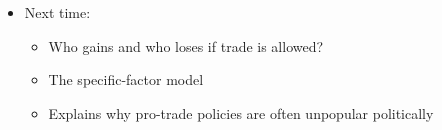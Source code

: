 \documentclass[ignorenonframetext,]{beamer}
\begin{document}
\begin{frame}

    \begin{itemize}
        \item Next time:
            \begin{itemize}
                \item Who gains and who loses if trade is allowed?
                \item The specific-factor model
                \item Explains why pro-trade policies are often unpopular politically
            \end{itemize}
    \end{itemize}

\end{frame}
\end{document}
